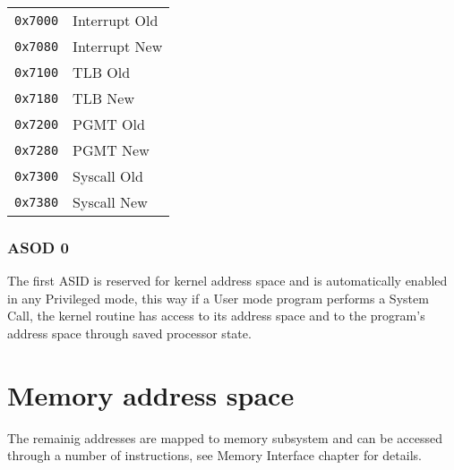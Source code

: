\begin{tabular}{r|l}
\texttt{0x7000} & Interrupt Old \\
\texttt{0x7080} & Interrupt New \\
\texttt{0x7100} & TLB Old \\
\texttt{0x7180} & TLB New \\
\texttt{0x7200} & PGMT Old \\
\texttt{0x7280} & PGMT New \\
\texttt{0x7300} & Syscall Old \\
\texttt{0x7380} & Syscall New \\
\end{tabular}

\subsubsection{ASOD 0}
The first ASID is reserved for kernel address space and is automatically enabled in any Privileged mode, this way if a User mode program performs a System Call, the kernel routine has access to its address space and to the program's address space through saved processor state.

\section{Memory address space}

The remainig addresses are mapped to memory subsystem and can be accessed through a number of instructions, see Memory Interface chapter for details.